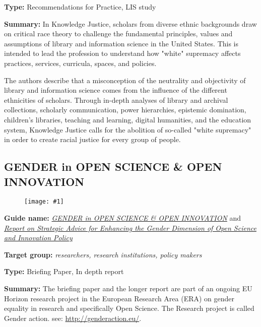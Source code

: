 \documentclass{article}
\newlength{\imgwidth}
\newcommand\scaledgraphics[2]{%
                
\settowidth{\imgwidth}{\texttt{[image: \#1]}}%
                
\setlength{\imgwidth}{\minof{\imgwidth}{#2\textwidth}}%
                
\texttt{[image: \#1]}%
                
}
\begin{document}
\textbf{Type:} Recommendations for Practice, LIS study


\textbf{Summary: }In Knowledge Justice, scholars from diverse ethnic backgrounds draw on critical race theory to challenge the fundamental principles, values and assumptions of library and information science in the United States. This is intended to lead the profession to understand how "white" supremacy affects practices, services, curricula, spaces, and policies.


The authors describe that a misconception of the neutrality and objectivity of library and information science comes from the influence of the different ethnicities of scholars. Through in-depth analyses of library and archival collections, scholarly communication, power hierarchies, epistemic domination, children's libraries, teaching and learning, digital humanities, and the education system, Knowledge Justice calls for the abolition of so-called "white supremacy" in order to create racial justice for every group of people.


\subsection{GENDER in OPEN SCIENCE \& OPEN INNOVATION}\label{H6993921}



\begin{center}
\begin{figure}
\scaledgraphics{59987ee5-bc7e-4c52-98de-ba70e420a252.jpg}{0.5}
\label{F24284111}
\end{figure}


\end{center}


\textbf{Guide name: }\emph{\href{https://genderaction.eu/wp-content/uploads/2018/07/GENDERACTION_PolicyBrief5_Gender-OSOI.pdf}{GENDER in OPEN SCIENCE \& OPEN INNOVATION}}\textbf{ }\autocite{gender_action_gender_2018} and \emph{\href{https://genderaction.eu/wp-content/uploads/2019/04/GENDERACTION_Report-5.1_D11_OSOI.pdf}{Report on Strategic Advice for Enhancing the Gender Dimension of Open Science and Innovation Policy}} \autocite{institute_of_sociology_report_2019}


\textbf{Target group:} \emph{researchers, research institutions, policy makers}


\textbf{Type: }Briefing Paper, In depth report


\textbf{Summary: }The briefing paper and the longer report are part of an ongoing EU Horizon research project in the European Research Area (ERA) on gender equality in research and specifically Open Science. The Research project is called Gender action. see: \href{http://genderaction.eu/}{http://genderaction.eu/}.
\end{document}
